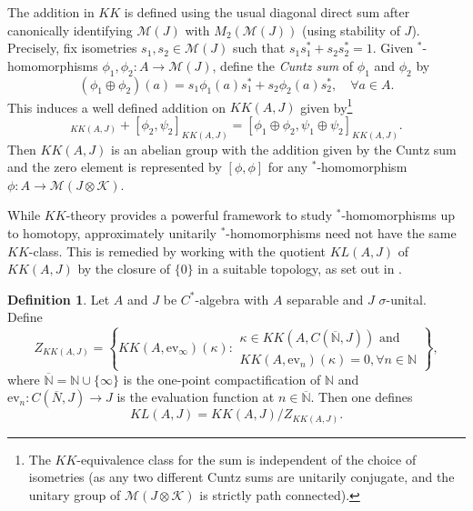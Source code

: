 \documentclass[reqno]{amsart}
\theoremstyle{definition}
\newtheorem{defn}[thm]{Definition}
\theoremstyle{remark}
\numberwithin{equation}{section}
\theoremstyle{definition}
\newcommand{\calM}{\mathcal{M}}
\newcommand{\calK}{\mathcal{K}}
\begin{document}
The addition in $KK$ is defined using the usual diagonal direct sum after canonically identifying $\mathcal M(J)$ with $M_2(\mathcal M(J))$ (using stability of $J$). Precisely, fix isometries $s_{1}, s_{2} \in \calM(J)$ such that $s_{1}s_{1}^{*} + s_{2}s_{2}^{*} = 1$. Given $^*$-homomorphisms $\phi_{1}, \phi_{2}: A\rightarrow \calM(J)$, define the \emph{Cuntz sum} of $\phi_{1}$ and $\phi_{2}$ by 
\begin{equation} 
\label{Cuntz sum} 
(\phi_{1} \oplus \phi_{2})(a) = s_{1} \phi_{1}(a) s_{1}^{*} + s_{2} \phi_{2}(a) s_{2}^{*}, \quad \forall a\in A. 
\end{equation}
This induces a well defined addition on $KK(A,J)$ given by\footnote{The $KK$-equivalence class for the sum is 
independent of the choice of isometries (as any two different Cuntz sums are unitarily conjugate, and the unitary group of $\calM(J\otimes \calK)$ is strictly path connected).} 
\begin{equation} 
[\phi_{1}, \psi_{1}]_{KK(A, J)} + [\phi_{2}, \psi_{2}]_{KK(A, J)} = [\phi_{1}\oplus \phi_{2}, \psi_{1}\oplus \psi_{2}]_{KK(A, J)}. 
\end{equation} 
Then $KK(A,J)$ is an abelian group with the addition given by the Cuntz sum and the zero element is represented by $[\phi, \phi]$ for any $^*$-homomorphism $\phi: A \rightarrow \calM(J\otimes \calK)$. 

While $KK$-theory provides a powerful framework to study $^*$-homomorphisms up to homotopy, approximately unitarily $^*$-homomorphisms need not have the same $KK$-class. This is remedied by working with the quotient $KL(A,J)$ of $KK(A,J)$ by the closure of $\{0\}$ in a suitable topology, as set out in \cite{Dadarlat_topo_KK}.

\begin{defn} 
Let $A$ and $J$ be $C^*$-algebra with $A$ separable and $J$ $\sigma$-unital. Define 
\begin{equation} 
Z_{KK(A, J)} = \left\{ KK(A, \text{ev}_{\infty}) (\kappa): 
\begin{array}{l}
\kappa \in KK(A, C(\overline{\mathbb{N}}, J)) \text{ and }\\
KK(A, \text{ev}_{n}) (\kappa) = 0, \forall n\in \mathbb{N}
\end{array}
\right\}, 
\end{equation} 
where $\overline{\mathbb{N}} = \mathbb{N}\cup \{\infty\}$ is the one-point compactification of $\mathbb{N}$ and $\text{ev}_{n}\colon C(\overline{N},J)\to J$ is the evaluation function at $n\in \overline{\mathbb{N}}$. Then one defines 
\begin{equation} 
KL(A,J) = KK(A, J) / Z_{KK(A,J)}. 
\end{equation} 
\end{defn} 
\end{document}
